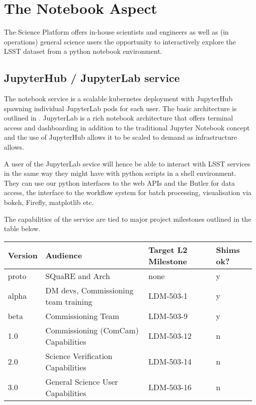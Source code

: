 \section{The Notebook Aspect}\label{notebook-aspect}

The Science Platform offers in-house scientists and engineers as well as (in operations) general science users the opportunity to interactively explore the LSST dataset from a python notebook environment.

\subsection{JupyterHub / JupyterLab service}\label{jupyterhub-jupyterlab-service}

The notebook service is a scalable kubernetes deployment with JupyterHub spawning individual JupyterLab pods for each user. The basic architecture is outlined in . JupyterLab is a rich notebook architecture that offers terminal access and dashboarding in addition to the traditional Jupyter Notebook concept and the use of JupyterHub allows it to be scaled to demand as infrastructure allows.

A user of the JupyterLab sevice will hence be able to interact with LSST services in the same way they might have with python scripts in a shell environment. They can use our python interfaces to the web APIs and the Butler for data access, the interface to the workflow system for batch processing, visualisation via bokeh, Firefly, matplotlib etc. 

The capabilities of the service are tied to major project milestones outlined in the table below.

\begin{footnotesize}
\begin{longtable}[c]{|l|l|l|l|}
\toprule
Version & Audience & Target L2 Milestone & Shims ok?\tabularnewline
\midrule
\endhead
proto & SQuaRE and Arch & none & y\tabularnewline
alpha & DM devs, Commissioning team training & LDM-503-1 &
y\tabularnewline
beta & Commissioning Team & LDM-503-9 & y\tabularnewline
1.0 & Commissioning (ComCam) Capabilities & LDM-503-12 &
n\tabularnewline
2.0 & Science Verification Capabilities & LDM-503-14 & n\tabularnewline
3.0 & General Science User Capabilities & LDM-503-16 & n\tabularnewline
\bottomrule
\end{longtable}
\end{footnotesize}

